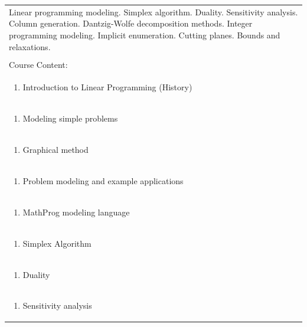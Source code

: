 \documentclass[11pt]{article}
\begin{document}
\begin{center}
\begin{longtable}{|p{4cm}|p{4cm}|p{4cm}|p{4cm}|}
\multicolumn{4}{|p{\dimexpr 16cm + 6\tabcolsep\relax}|}{Linear programming modeling. Simplex algorithm. Duality. Sensitivity analysis. Column generation. Dantzig-Wolfe decomposition methods. Integer programming modeling. Implicit enumeration. Cutting planes. Bounds and relaxations.}\\
\multicolumn{4}{|p{16cm}|}{}\\
\hline
\multicolumn{4}{|p{16cm}|}{Course Content:}\\*
\multicolumn{4}{|p{\dimexpr 16cm + 6\tabcolsep\relax}|}{\begin{enumerate}[start=1]\item Introduction to Linear Programming (History)\end{enumerate}}\\
\multicolumn{4}{|p{\dimexpr 16cm + 6\tabcolsep\relax}|}{\begin{enumerate}[start=2]\item Modeling simple problems\end{enumerate}}\\
\multicolumn{4}{|p{\dimexpr 16cm + 6\tabcolsep\relax}|}{\begin{enumerate}[start=3]\item Graphical method\end{enumerate}}\\
\multicolumn{4}{|p{\dimexpr 16cm + 6\tabcolsep\relax}|}{\begin{enumerate}[start=4]\item Problem modeling and example applications\end{enumerate}}\\
\multicolumn{4}{|p{\dimexpr 16cm + 6\tabcolsep\relax}|}{\begin{enumerate}[start=5]\item MathProg modeling language\end{enumerate}}\\
\multicolumn{4}{|p{\dimexpr 16cm + 6\tabcolsep\relax}|}{\begin{enumerate}[start=6]\item Simplex Algorithm\end{enumerate}}\\
\multicolumn{4}{|p{\dimexpr 16cm + 6\tabcolsep\relax}|}{\begin{enumerate}[start=7]\item Duality\end{enumerate}}\\
\multicolumn{4}{|p{\dimexpr 16cm + 6\tabcolsep\relax}|}{\begin{enumerate}[start=8]\item Sensitivity analysis\end{enumerate}}\\

\end{longtable}
\end{center}
\end{document}
